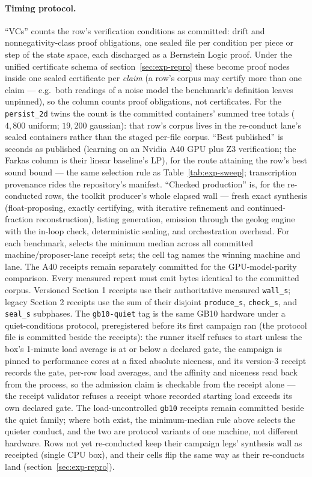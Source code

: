 \paragraph{Timing protocol.}
``VCs'' counts the row's verification conditions as
committed: drift and nonnegativity-class proof obligations, one
sealed file per condition per piece or step of the state space, each
discharged as a Bernstein Logic proof. Under the unified certificate
schema of section~\ref{sec:exp-repro} these become proof nodes inside
one sealed certificate per \emph{claim} (a row's corpus may certify
more than one claim --- e.g.\ both readings of a noise model the
benchmark's definition leaves unpinned), so the column counts proof
obligations, not certificates. For the \texttt{persist\_2d} twins the
count is the committed containers' summed tree totals ($4{,}800$
uniform; $19{,}200$ gaussian): that row's corpus lives in the
re-conduct lane's sealed containers rather than the staged per-file
corpus.
``Best published'' is seconds as published (learning on an
Nvidia A40 GPU plus Z3 verification; the Farkas column is their linear
baseline's LP), for the route attaining the row's best sound bound ---
the same selection rule as Table~\ref{tab:exp-sweep}; transcription
provenance rides the repository's manifest. ``Checked production'' is, for the re-conducted rows, the toolkit
producer's whole elapsed wall --- fresh exact synthesis (float-proposing,
exactly certifying, with iterative refinement and continued-fraction
reconstruction), listing generation, emission through the geolog engine with
the in-loop check, deterministic sealing, and orchestration overhead. For
each benchmark,  selects the minimum median across
all committed machine/proposer-lane receipt sets; the cell tag names the
winning machine and lane. The A40 receipts remain separately committed for
the GPU-model-parity comparison. Every measured repeat must emit bytes
identical to the committed corpus. Versioned Section 1 receipts use their
authoritative measured \texttt{wall\_s}; legacy Section 2 receipts use the sum
of their disjoint \texttt{produce\_s}, \texttt{check\_s}, and
\texttt{seal\_s} subphases. The \texttt{gb10-quiet} tag is the same GB10
hardware under a quiet-conditions protocol, preregistered before its first
campaign ran (the protocol file is committed beside the receipts): the runner
itself refuses to start unless the box's 1-minute load average is at or below
a declared gate, the campaign is pinned to performance cores at a fixed
absolute niceness, and its version-3 receipt records the gate, per-row load
averages, and the affinity and niceness read back from the process, so the
admission claim is checkable from the receipt alone --- the receipt validator
refuses a receipt whose recorded starting load exceeds its own declared gate.
The load-uncontrolled \texttt{gb10} receipts remain committed beside the
quiet family; where both exist, the minimum-median rule above selects the
quieter conduct, and the two are protocol variants of one machine, not
different hardware. Rows not yet re-conducted keep their campaign
legs' synthesis wall as receipted (single CPU box), and their cells flip the
same way as their re-conducts land (section~\ref{sec:exp-repro}).

